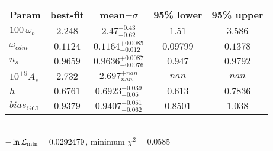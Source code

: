 \begin{tabular}{|l|c|c|c|c|} 
 \hline 
Param & best-fit & mean$\pm\sigma$ & 95\% lower & 95\% upper \\ \hline 
$100~\omega_{b }$ &$2.248$ & $2.47_{-0.62}^{+0.43}$ & $1.51$ & $3.586$ \\ 
$\omega_{cdm }$ &$0.1124$ & $0.1164_{-0.012}^{+0.0085}$ & $0.09799$ & $0.1378$ \\ 
$n_{s }$ &$0.9659$ & $0.9636_{-0.0076}^{+0.0087}$ & $0.947$ & $0.9792$ \\ 
$10^{+9}A_{s }$ &$2.732$ & $2.697_{nan}^{+nan}$ & $nan$ & $nan$ \\ 
$h$ &$0.6761$ & $0.6923_{-0.05}^{+0.039}$ & $0.613$ & $0.7836$ \\ 
$bias_{GC 1 }$ &$0.9379$ & $0.9407_{-0.062}^{+0.051}$ & $0.8501$ & $1.038$ \\ 
\hline 
 \end{tabular} \\ 
$-\ln{\cal L}_\mathrm{min} =0.0292479$, minimum $\chi^2=0.0585$ \\ 
